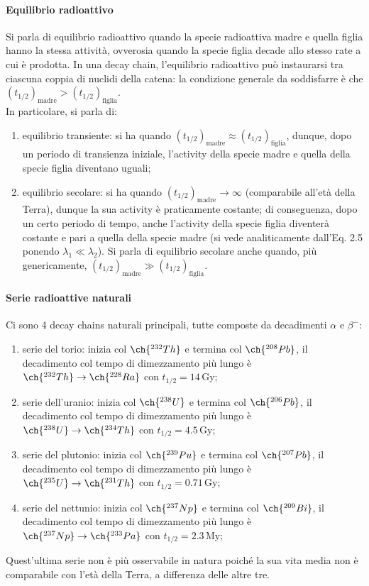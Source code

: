 \paragraph{Equilibrio radioattivo} Si parla di equilibrio radioattivo quando la specie radioattiva madre e quella figlia hanno la stessa attività, ovverosia quando la specie figlia decade allo stesso rate a cui è prodotta. In una decay chain, l'equilibrio radioattivo può instaurarsi tra ciascuna coppia di nuclidi della catena: la condizione generale da soddisfarre è che $ (t_{1/2})_{\text{madre}} > (t_{1/2})_{\text{figlia}} $.\\
In particolare, si parla di:
\begin{enumerate}
	\item equilibrio transiente: si ha quando $ (t_{1/2})_{\text{madre}} \approx (t_{1/2})_{\text{figlia}} $, dunque, dopo un periodo di transienza iniziale, l'activity della specie madre e quella della specie figlia diventano uguali;
	\item equilibrio secolare: si ha quando $ (t_{1/2})_{\text{madre}} \rightarrow \infty $ (comparabile all'età della Terra), dunque la sua activity è praticamente costante; di conseguenza, dopo un certo periodo di tempo, anche l'activity della specie figlia diventerà costante e pari a quella della specie madre (si vede analiticamente dall'Eq. 2.5 ponendo $ \lambda_1 \ll \lambda_2 $). Si parla di equilibrio secolare anche quando, più genericamente, $ (t_{1/2})_{\text{madre}} \gg (t_{1/2})_{\text{figlia}} $.
\end{enumerate}

\paragraph{Serie radioattive naturali}

Ci sono 4 decay chains naturali principali, tutte composte da decadimenti $ \alpha $ e $ \beta^- $:
\begin{enumerate}
  \item serie del torio: inizia col $ \ch{^{232} Th} $ e termina col $ \ch{^{208} Pb} $, il decadimento col tempo di dimezzamento più lungo è $ \ch{^{232} Th} \rightarrow \ch{^{228} Ra} $ con $ t_{1/2} = 14 \,\text{Gy} $;
  \item serie dell'uranio: inizia col $ \ch{^{238} U} $ e termina col $ \ch{^{206} Pb} $, il decadimento col tempo di dimezzamento più lungo è $ \ch{^{238} U} \rightarrow \ch{^{234} Th} $ con $ t_{1/2} = 4.5 \,\text{Gy} $;
  \item serie del plutonio: inizia col $ \ch{^{239} Pu} $ e termina col $ \ch{^{207} Pb} $, il decadimento col tempo di dimezzamento più lungo è $ \ch{^{235} U} \rightarrow \ch{^{231} Th} $ con $ t_{1/2} = 0.71 \,\text{Gy} $;
  \item serie del nettunio: inizia col $ \ch{^{237} Np} $ e termina col $ \ch{^{209} Bi} $, il decadimento col tempo di dimezzamento più lungo è $ \ch{^{237} Np} \rightarrow \ch{^{233} Pa} $ con $ t_{1/2} = 2.3 \,\text{My} $;
\end{enumerate}
Quest'ultima serie non è più osservabile in natura poiché la sua vita media non è comparabile con l'età della Terra, a differenza delle altre tre.

